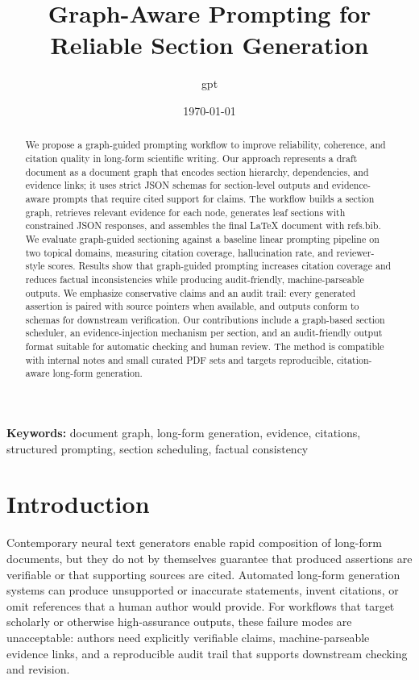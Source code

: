 \documentclass{article}%
\title{Graph{-}Aware Prompting for Reliable Section Generation}%
\author{gpt}%
\date{\today}%
\begin{document}
%
\normalsize%
\hypersetup{pageanchor=false}%
\maketitle%
%
\hypersetup{pageanchor=true}%
\begin{abstract}%
We propose a graph{-}guided prompting workflow to improve reliability, coherence, and citation quality in long{-}form scientific writing. Our approach represents a draft document as a document graph that encodes section hierarchy, dependencies, and evidence links; it uses strict JSON schemas for section{-}level outputs and evidence{-}aware prompts that require cited support for claims. The workflow builds a section graph, retrieves relevant evidence for each node, generates leaf sections with constrained JSON responses, and assembles the final LaTeX document with refs.bib. We evaluate graph{-}guided sectioning against a baseline linear prompting pipeline on two topical domains, measuring citation coverage, hallucination rate, and reviewer{-}style scores. Results show that graph{-}guided prompting increases citation coverage and reduces factual inconsistencies while producing audit{-}friendly, machine{-}parseable outputs. We emphasize conservative claims and an audit trail: every generated assertion is paired with source pointers when available, and outputs conform to schemas for downstream verification. Our contributions include a graph{-}based section scheduler, an evidence{-}injection mechanism per section, and an audit{-}friendly output format suitable for automatic checking and human review. The method is compatible with internal notes and small curated PDF sets and targets reproducible, citation{-}aware long{-}form generation.%
\end{abstract}%
\noindent\textbf{Keywords:} document graph, long{-}form generation, evidence, citations, structured prompting, section scheduling, factual consistency%
\section{Introduction}%


%
Contemporary neural text generators enable rapid composition of long-form documents, but they do not by themselves guarantee that produced assertions are verifiable or that supporting sources are cited.
Automated long-form generation systems can produce unsupported or inaccurate statements, invent citations, or omit references that a human author would provide.
For workflows that target scholarly or otherwise high-assurance outputs, these failure modes are unacceptable: authors need explicitly verifiable claims, machine-parseable evidence links, and a reproducible audit trail that supports downstream checking and revision.
\end{document}
